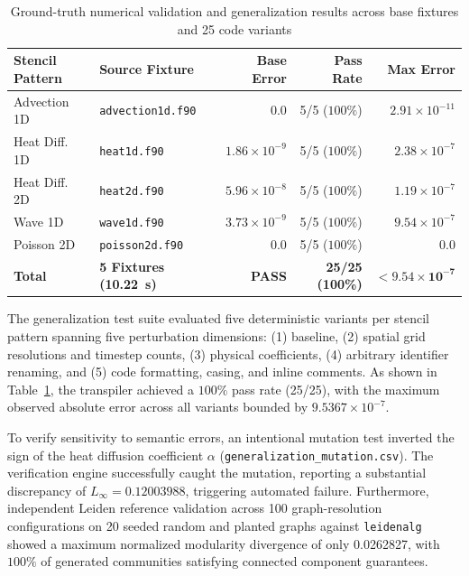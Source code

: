 \documentclass[conference]{IEEEtran}
\begin{document}
\begin{table}[!t]
\caption{Ground-truth numerical validation and generalization results across base fixtures and 25 code variants}
\label{tab:numeric}\centering\scriptsize
\setlength{\tabcolsep}{2.5pt}
\begin{tabularx}{\columnwidth}{l X r r r}\toprule
Stencil Pattern & Source Fixture & Base Error & Pass Rate & Max Error \\ \midrule
Advection 1D & \texttt{advection1d.f90} & $0.0$ & 5/5 ($100\%$) & $2.91\times 10^{-11}$ \\
Heat Diff. 1D & \texttt{heat1d.f90} & $1.86\times 10^{-9}$ & 5/5 ($100\%$) & $2.38\times 10^{-7}$ \\
Heat Diff. 2D & \texttt{heat2d.f90} & $5.96\times 10^{-8}$ & 5/5 ($100\%$) & $1.19\times 10^{-7}$ \\
Wave 1D & \texttt{wave1d.f90} & $3.73\times 10^{-9}$ & 5/5 ($100\%$) & $9.54\times 10^{-7}$ \\
Poisson 2D & \texttt{poisson2d.f90} & $0.0$ & 5/5 ($100\%$) & $0.0$ \\ \midrule
\textbf{Total} & \textbf{5 Fixtures (10.22~s)} & \textbf{PASS} & \textbf{25/25 (100\%)} & $\mathbf{< 9.54\times 10^{-7}}$ \\
\bottomrule\end{tabularx}
\end{table}

The generalization test suite evaluated five deterministic variants per stencil pattern spanning five perturbation dimensions: (1) baseline, (2) spatial grid resolutions and timestep counts, (3) physical coefficients, (4) arbitrary identifier renaming, and (5) code formatting, casing, and inline comments. As shown in Table~\ref{tab:numeric}, the transpiler achieved a $100\%$ pass rate (25/25), with the maximum observed absolute error across all variants bounded by $9.5367\times 10^{-7}$.

To verify sensitivity to semantic errors, an intentional mutation test inverted the sign of the heat diffusion coefficient $\alpha$ (\texttt{generalization\_mutation.csv}). The verification engine successfully caught the mutation, reporting a substantial discrepancy of $L_\infty = 0.12003988$, triggering automated failure. Furthermore, independent Leiden reference validation across 100 graph-resolution configurations on 20 seeded random and planted graphs against \texttt{leidenalg} showed a maximum normalized modularity divergence of only 0.0262827, with $100\%$ of generated communities satisfying connected component guarantees.
\end{document}
